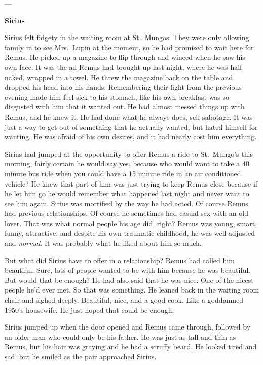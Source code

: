 \documentclass[12pt,twoside,openright]{memoir}
\begin{document}
---

\textbf{Sirius} 

Sirius felt fidgety in the waiting room at St.\ Mungos. They were only allowing family in to see Mrs.\ Lupin at the moment, so he had promised to wait here for Remus. He picked up a magazine to flip through and winced when he saw his own face. It was the ad Remus had brought up last night, where he was half naked, wrapped in a towel. He threw the magazine back on the table and dropped his head into his hands. Remembering their fight from the previous evening made him feel sick to his stomach, like his own breakfast was so disgusted with him that it wanted out. He had almost messed things up with Remus, and he knew it. He had done what he always does, self-sabotage. It was just a way to get out of something that he actually wanted, but hated himself for wanting. He was afraid of his own desires, and it had nearly cost him everything.

Sirius had jumped at the opportunity to offer Remus a ride to St.\ Mungo's this morning, fairly certain he would say yes, because who would want to take a 40 minute bus ride when you could have a 15 minute ride in an air conditioned vehicle?
He knew that part of him was just trying to keep Remus close because if he let him go he would remember what happened last night and never want to see him again. Sirius was mortified by the way he had acted. Of course Remus had previous relationships. Of course he sometimes had casual sex with an old lover. That was what normal people his age did, right?
Remus was young, smart, funny, attractive, and despite his own traumatic childhood, he was well adjusted and
\textit{normal}. It was probably what he liked about him so much. 

But what did Sirius have to offer in a relationship? Remus had called him beautiful. Sure, lots of people wanted to be with him because he was beautiful. But would that be enough? He had also said that he was nice. One of the nicest people he'd ever met. So that was something. He leaned back in the waiting room chair and sighed deeply. Beautiful, nice, and a good cook. Like a goddamned 1950's housewife. He just hoped that could be enough.

Sirius jumped up when the door opened and Remus came through, followed by an older man who could only be his father. He was just as tall and thin as Remus, but his hair was graying and he had a scruffy beard. He looked tired and sad, but he smiled as the pair approached Sirius.
\end{document}
